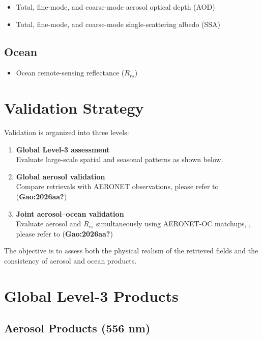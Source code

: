 \documentclass[
  letterpaper,
]{scrbook}
\providecommand{\tightlist}{%
  \setlength{\itemsep}{0pt}\setlength{\parskip}{0pt}}
\begin{document}
\begin{itemize}
\tightlist
\item
  Total, fine-mode, and coarse-mode aerosol optical depth (AOD)
\item
  Total, fine-mode, and coarse-mode single-scattering albedo (SSA)
\end{itemize}

\subsection{Ocean}\label{ocean}

\begin{itemize}
\tightlist
\item
  Ocean remote-sensing reflectance (\(R_{rs}\))
\end{itemize}

\section{Validation Strategy}\label{validation-strategy}

Validation is organized into three levels:

\begin{enumerate}
\def\labelenumi{\arabic{enumi}.}
\item
  \textbf{Global Level-3 assessment}\\
  Evaluate large-scale spatial and seasonal patterns as shown below.
\item
  \textbf{Global aerosol validation}\\
  Compare retrievals with AERONET observations, please refer to
  (\textbf{Gao:2026aa?})
\item
  \textbf{Joint aerosol--ocean validation}\\
  Evaluate aerosol and \(R_{rs}\) simultaneously using AERONET-OC
  matchups, , please refer to (\textbf{Gao:2026aa?})
\end{enumerate}

The objective is to assess both the physical realism of the retrieved
fields and the consistency of aerosol and ocean products.

\section{Global Level-3 Products}\label{global-level-3-products}

\subsection{Aerosol Products (556 nm)}\label{aerosol-products-556-nm}
\end{document}
